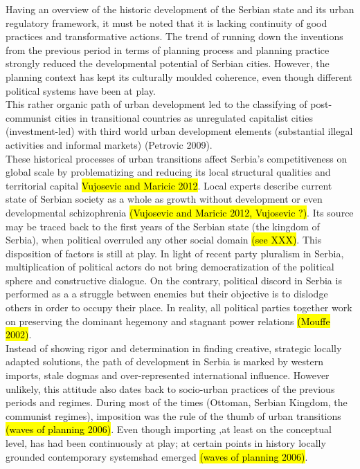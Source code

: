 \documentclass[11pt]{report}
\begin{document}
Having an overview of the historic development of the Serbian state and its urban regulatory framework, it must be noted that it is lacking continuity of good practices and transformative actions. The trend of running down the inventions from the previous period in terms of planning process and planning practice strongly reduced the developmental potential of Serbian cities\cite{ref Peric 2016}. However, the planning context has kept its culturally moulded coherence, even though different political systems have been at play.
\\    
This rather organic path of urban development led to the classifying of post-communist cities in transitional countries as unregulated capitalist cities (investment-led) with third world urban development elements (substantial illegal activities and informal markets) (Petrovic 2009).
\\ 
These historical processes of urban transitions affect Serbia's competitiveness on global scale by problematizing and reducing its local structural qualities and territorial capital \hl{Vujosevic and Maricic 2012}. Local experts describe current state of Serbian society as a whole as growth without development or even developmental schizophrenia \hl{(Vujosevic and Maricic 2012, Vujosevic ?)}.
Its source may be traced back to the first years of the Serbian state (the kingdom of Serbia), when political overruled any other social domain \hl{(see XXX)}. This disposition of factors is still at play. In light of recent party pluralism in Serbia, multiplication of political actors do not bring democratization of the political sphere and constructive dialogue. On the contrary, political discord in Serbia is performed as a a struggle between enemies but their objective is to dislodge others in order to occupy their place. In reality, all political parties together work on preserving the dominant hegemony and stagnant power relations \hl{(Mouffe 2002)}.
\\
Instead of showing rigor and determination in finding creative, strategic locally adapted solutions, the path of development in Serbia is marked by western imports, stale dogmas and over-represented international influence. However unlikely, this attitude also dates back to socio-urban practices of the previous periods and regimes. During most of the times (Ottoman, Serbian Kingdom, the communist regimes), imposition was the rule of the thumb of urban transitions \hl{(waves of planning 2006)}. Even though importing ,at least on the conceptual level, has had been continuously at play; at certain points in history locally grounded contemporary systems\footnotemark had emerged \hl{(waves of planning 2006)}.
\end{document}
